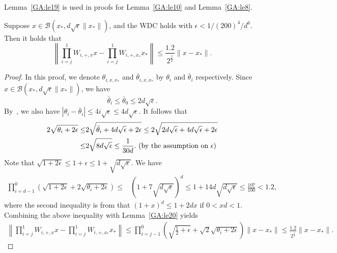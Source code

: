 Lemma~\ref{GA:le19} is used in proofs for Lemma~\ref{GA:le10} and Lemma~\ref{GA:le8}.


\begin{lemma} \label{GA:le19}
Suppose $x \in \mathcal{B}(x_*, d \sqrt{\epsilon} \|x_*\|)$, and
the WDC
holds with $\epsilon < 1/ (200)^4 / d^6$. Then it holds that
\begin{equation*}
\left\|\prod_{i = j}^1 W_{i, +, x} x - \prod_{i = j}^1 W_{i, +, x_*} x_*\right\| \leq \frac{1.2}{2^{\frac{j}{2}}} \|x - x_*\|.
\end{equation*}
\end{lemma}
\begin{proof}
In this proof, we denote $\theta_{i, x, x_*}$ and $\bar{\theta}_{i, x, x_*}$ by $\theta_i$ and $\bar{\theta}_{i}$ respectively.
Since $x \in \mathcal{B}(x_*, d \sqrt{\epsilon} \|x_*\|)$, we have
\begin{equation} \label{GA:e40}
\bar{\theta}_{i} \leq \bar{\theta}_{0} \leq 2 d \sqrt{\epsilon}.
\end{equation}
By~\cite[(14)]{HV17}, we also have
$|\theta_{i} - \bar{\theta}_{i}| \leq 4 i \sqrt{\epsilon} \leq 4 d \sqrt{\epsilon}$.
It follows that
\begin{align}
2 \sqrt{\theta_i + 2 \epsilon} \leq& 2 \sqrt{\bar{\theta}_i + 4 d \sqrt{\epsilon} + 2\epsilon} \leq 2 \sqrt{2 d \sqrt{\epsilon} + 4 d \sqrt{\epsilon} + 2\epsilon} \nonumber \\
\leq& 2 \sqrt{8 d \sqrt{\epsilon}} \leq \frac{1}{30 d}. \hbox{ (by the assumption on $\epsilon$)} \label{GA:e39}
\end{align}
Note that $\sqrt{1 + 2 \epsilon} \leq 1 + \epsilon \leq 1 + \sqrt{d\sqrt{\epsilon}}$. We have
\begin{align*}
\prod_{i = d - 1}^0 \left( \sqrt{1+2\epsilon} + 2 \sqrt{ \theta_i + 2 \epsilon} \right) \leq& \left(1 + 7 \sqrt{d\sqrt{\epsilon}}\right)^d \leq 1 + 14 d \sqrt{d\sqrt{\epsilon}} \leq \frac{107}{100} < 1.2,
\end{align*}
where the second inequality is from that $(1+x)^d \leq 1 + 2dx$ if $0 < x d < 1$.
Combining the above inequality with Lemma~\ref{GA:le20} yields
\begin{align*}
\left\|\prod_{i = j}^1 W_{i, +, x}x - \prod_{i = j}^1 W_{i, +, x_*} x_*\right\| \leq \prod_{i = j - 1}^0 \left( \sqrt{\frac{1}{2}+\epsilon} + \sqrt{2} \sqrt{ \theta_i + 2 \epsilon} \right) \|x - x_*\| \leq \frac{1.2}{2^{\frac{j}{2}}} \|x - x_*\|.
\end{align*}
\end{proof}

